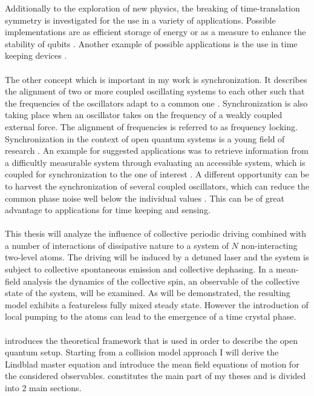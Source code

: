 Additionally to the exploration of new physics, the breaking of time-translation symmetry is investigated for the use in a variety of applications. Possible implementations are as efficient storage of energy \cite{paulino_thermodynamics_2025} or as a measure to enhance the stability of qubits \cite{barnes_stabilization_2019,qiao_floquet-enhanced_2021}. Another example of possible applications is the use in time keeping devices \cite{taheri_all-optical_2022}.\\\\
The other concept which is important in my work is synchronization. It describes the alignment of two or more coupled oscillating systems to each other such that the frequencies of the oscillators adapt to a common one \cite{pikovskij_synchronization_2007}. Synchronization is also taking place when an oscillator takes on the frequency of a weakly coupled external force. The alignment of frequencies is referred to as frequency locking. Synchronization in the context of open quantum systems is a young field of research \cite{galve_quantum_2017}. An example for suggested applications was to retrieve information from a difficultly measurable system through evaluating an accessible system, which is coupled for synchronization to the one of interest \cite{giorgi_probing_2016}. A different opportunity can be to harvest the synchronization of several coupled oscillators, which can reduce the common phase noise well below the individual values \cite{zhang_synchronization_2015,matheny_phase_2014}. This can be of great advantage to applications for time keeping and sensing.\\\\
This thesis will analyze the influence of collective periodic driving combined with a number of interactions of dissipative nature to a system of $N$ non-interacting two-level atoms. The driving will be induced by a detuned laser and the system is subject to collective spontaneous emission and collective dephasing. %
In a mean-field analysis the dynamics of the collective spin, an observable of the collective state of the system, will be examined. As will be demonstrated, the resulting model exhibits a featureless fully mixed steady state. However the introduction of local pumping to the atoms can lead to the emergence of a time crystal phase.\\\\
 introduces the theoretical framework that is used in order to describe the open quantum setup. Starting from a collision model approach I will derive the Lindblad master equation and introduce the mean field equations of motion for the considered observables.  constitutes the main part of my theses and is divided into 2 main sections. 

